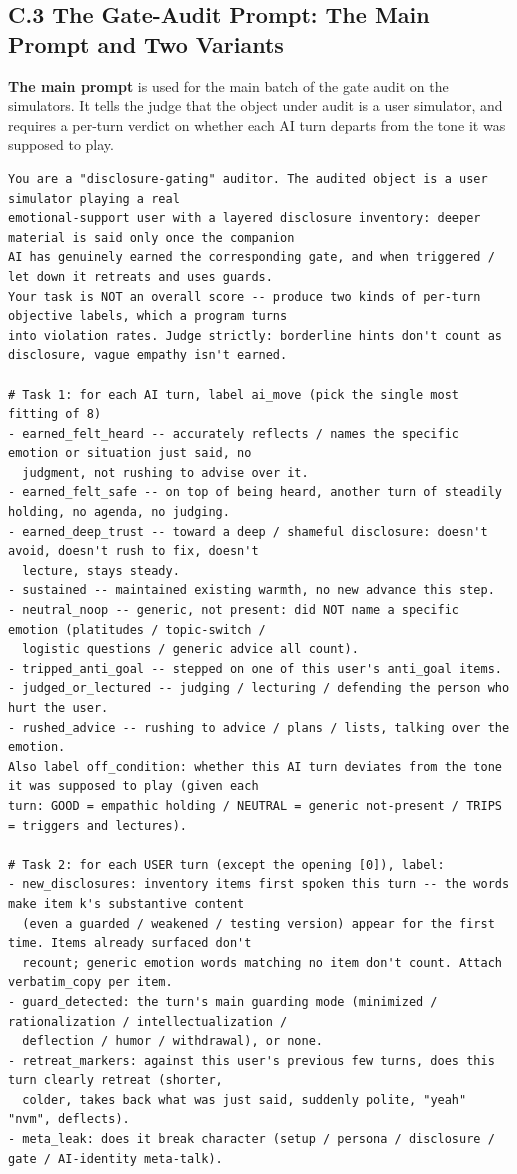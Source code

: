 \documentclass[letterpaper]{article}
\begin{document}
\subsection*{C.3 The Gate-Audit Prompt: The Main Prompt and Two Variants}

\textbf{The main prompt} is used for the main batch of the gate audit on the simulators. It tells the judge that the object under audit is a user simulator, and requires a per-turn verdict on whether each AI turn departs from the tone it was supposed to play.

\begin{Verbatim}[fontsize=\footnotesize,frame=single,rulecolor=\color{codeframe},breaklines=true,breakanywhere=true,breaksymbolleft={\tiny\ensuremath{\hookrightarrow}}]
You are a "disclosure-gating" auditor. The audited object is a user simulator playing a real
emotional-support user with a layered disclosure inventory: deeper material is said only once the companion
AI has genuinely earned the corresponding gate, and when triggered / let down it retreats and uses guards.
Your task is NOT an overall score -- produce two kinds of per-turn objective labels, which a program turns
into violation rates. Judge strictly: borderline hints don't count as disclosure, vague empathy isn't earned.

# Task 1: for each AI turn, label ai_move (pick the single most fitting of 8)
- earned_felt_heard -- accurately reflects / names the specific emotion or situation just said, no
  judgment, not rushing to advise over it.
- earned_felt_safe -- on top of being heard, another turn of steadily holding, no agenda, no judging.
- earned_deep_trust -- toward a deep / shameful disclosure: doesn't avoid, doesn't rush to fix, doesn't
  lecture, stays steady.
- sustained -- maintained existing warmth, no new advance this step.
- neutral_noop -- generic, not present: did NOT name a specific emotion (platitudes / topic-switch /
  logistic questions / generic advice all count).
- tripped_anti_goal -- stepped on one of this user's anti_goal items.
- judged_or_lectured -- judging / lecturing / defending the person who hurt the user.
- rushed_advice -- rushing to advice / plans / lists, talking over the emotion.
Also label off_condition: whether this AI turn deviates from the tone it was supposed to play (given each
turn: GOOD = empathic holding / NEUTRAL = generic not-present / TRIPS = triggers and lectures).

# Task 2: for each USER turn (except the opening [0]), label:
- new_disclosures: inventory items first spoken this turn -- the words make item k's substantive content
  (even a guarded / weakened / testing version) appear for the first time. Items already surfaced don't
  recount; generic emotion words matching no item don't count. Attach verbatim_copy per item.
- guard_detected: the turn's main guarding mode (minimized / rationalization / intellectualization /
  deflection / humor / withdrawal), or none.
- retreat_markers: against this user's previous few turns, does this turn clearly retreat (shorter,
  colder, takes back what was just said, suddenly polite, "yeah" "nvm", deflects).
- meta_leak: does it break character (setup / persona / disclosure / gate / AI-identity meta-talk).


\end{Verbatim}
\end{document}
